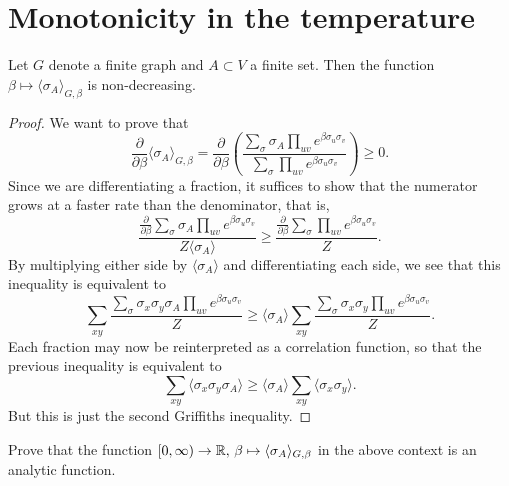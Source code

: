 \section{Monotonicity in the temperature}

\begin{theorem}
    Let $G$ denote a finite graph and $A\subset V$ a finite set.
    Then the function $\beta\mapsto\langle\sigma_A\rangle_{G,\beta}$
    is non-decreasing.
\end{theorem}

\begin{proof}
    We want to prove that
    \[
        \frac{\partial}{\partial\beta}
        \langle\sigma_A\rangle_{G,\beta}
        =
        \frac{\partial}{\partial\beta}
        \left(
            \frac{
                \sum_\sigma\sigma_A\prod_{uv}e^{\beta\sigma_u\sigma_v}
            }{
                \sum_\sigma\prod_{uv}e^{\beta\sigma_u\sigma_v}
            }
        \right)
        \geq 0.
    \]
    Since we are differentiating a fraction,
    it suffices to show that the numerator grows at a faster rate
    than the denominator,
    that is,
    \[
        \frac{\frac{\partial}{\partial\beta}
            \sum_\sigma\sigma_A\prod_{uv}e^{\beta\sigma_u\sigma_v}
        }{
            Z\langle\sigma_A\rangle
        }
        \geq
        \frac{\frac{\partial}{\partial\beta}
            \sum_\sigma\prod_{uv}e^{\beta\sigma_u\sigma_v}
        }{
            Z
        }.
    \]
    By multiplying either side by $\langle\sigma_A\rangle$
    and differentiating each side,
    we see that this inequality is equivalent to
    \[
       \sum_{xy}
        \frac{\sum_\sigma
            \sigma_x\sigma_y\sigma_A\prod_{uv}e^{\beta\sigma_u\sigma_v}
        }{Z}
        \geq
        \langle\sigma_A\rangle
        \sum_{xy}
        \frac{
            \sum_\sigma
            \sigma_x\sigma_y
            \prod_{uv}e^{\beta\sigma_u\sigma_v}
        }{Z}.
    \]
    Each fraction may now be reinterpreted as a correlation function,
    so that the previous inequality is equivalent to
    \[
        \sum_{xy}\langle\sigma_x\sigma_y\sigma_A\rangle
        \geq
        \langle\sigma_A\rangle
        \sum_{xy}\langle\sigma_x\sigma_y\rangle.
    \]
    But this is just the second Griffiths inequality.
\end{proof}

\begin{exercise}
    Prove that the function $[0,\infty)\to\mathbb R,\,\beta\mapsto\langle\sigma_A\rangle_{G,\beta}$
    in the above context is an analytic function.
\end{exercise}
